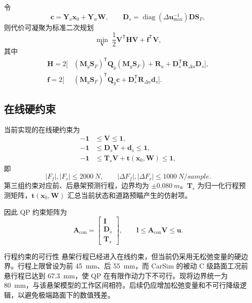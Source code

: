 \documentclass[UTF8,12pt,a4paper,fontset=windows]{ctexart}
\newcommand{\vect}[1]{\bm{#1}}
\newcommand{\trans}{^{\mathsf T}}
\newcommand{\diag}{\operatorname{diag}}
\begin{document}
令
\begin{equation}
\vect{c}=\vect{Y}_x\vect{x}_0+\vect{Y}_w\vect{W},\qquad
\vect{D}_s=\diag(\Delta\vect{u}_{\max}^{-1})\vect{D}\vect{S}_F,
\end{equation}
则代价可凝聚为标准二次规划
\begin{equation}
\min_{\vect{V}}\;\frac{1}{2}\vect{V}\trans\vect{H}\vect{V}+\vect{f}\trans\vect{V},
\end{equation}
其中
\begin{align}
\vect{H}=2\Big[&
(\vect{M}_y\vect{S}_F)\trans\vect{Q}_y(\vect{M}_y\vect{S}_F)
+\vect{R}_u+\vect{D}_s\trans\vect{R}_{\Delta u}\vect{D}_s\Big],\\
\vect{f}=2\Big[&
(\vect{M}_y\vect{S}_F)\trans\vect{Q}_y\vect{c}
+\vect{D}_s\trans\vect{R}_{\Delta u}\vect{d}_s\Big].
\end{align}

\subsection{在线硬约束}

当前实现的在线硬约束为
\begin{align}
-\vect{1}&\le \vect{V}\le \vect{1},\\
-\vect{1}&\le \vect{D}_s\vect{V}+\vect{d}_s\le \vect{1},\\
-\vect{1}&\le \vect{T}_s\vect{V}+\vect{t}(\vect{x}_0,\vect{W})\le \vect{1},
\end{align}
即
\begin{equation}
|F_f|,|F_r|\le \SI{2000}{N},\qquad
|\Delta F_f|,|\Delta F_r|\le \SI{1000}{N/sample}.
\end{equation}
第三组约束对应前、后悬架预测行程，边界均为 $\pm\SI{0.080}{m}$。$\vect{T}_s$ 为归一化行程预测矩阵，$\vect{t}(\vect{x}_0,\vect{W})$ 汇总当前状态和道路预瞄产生的仿射项。

因此 QP 约束矩阵为
\begin{equation}
\vect{A}_{\text{con}}=
\begin{bmatrix}\vect{I}\\\vect{D}_s\\\vect{T}_s\end{bmatrix},
\qquad
\vect{l}\le\vect{A}_{\text{con}}\vect{V}\le\vect{u}.
\end{equation}

\begin{notebox}{行程约束的可行性}
悬架行程已经进入在线约束，但当前仍采用无松弛变量的硬边界。行程上限曾设为前 \SI{45}{mm}、后 \SI{55}{mm}，而 CarSim 的被动 C 级路面工况前悬行程已达到 \SI{67.3}{mm}，使 QP 在有限作动力下不可行。现将边界统一为 \SI{80}{mm}，与该悬架模型的工作区间相符。后续仍应增加松弛变量和不可行降级逻辑，以避免极端路面下的数值残差。
\end{notebox}
\end{document}
